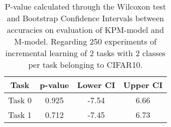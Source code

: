 \begin{table}[H]
\centering
\begin{tabular}{cccc}
\toprule
Task & p-value & Lower CI & Upper CI \\
\midrule
Task 0 & 0.925 &-7.54 & 6.66 \\
Task 1 & 0.712 &-7.45 & 6.73 \\
\bottomrule
\end{tabular}
\caption{P-value calculated through the Wilcoxon test and Bootstrap Confidence Intervals between accuracies on evaluation of KPM-model and M-model. Regarding 250 experiments of incremental learning of 2 tasks with 2 classes per task belonging to CIFAR10.}
\end{table}
